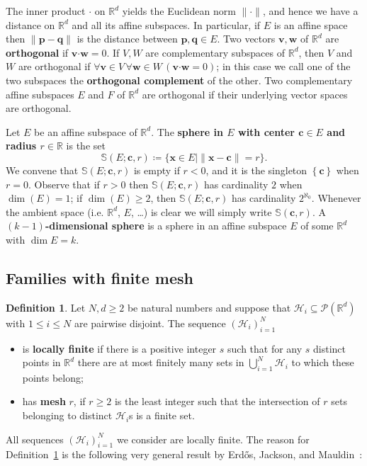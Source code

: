 \documentclass[12pt]{amsart}
\newcommand{\FORALL}[1]{\forall {#1} \, }
\newcommand{\R}{\mathbb{R}}	%
\newcommand{\Pow}{\mathscr{P}}		%
\newcommand{\markdef}[1]{\textbf{#1}} %
\newcommand{\Mid}{\boldsymbol\mid}			%
\newcommand{\setof}[2]{\mathopen \{{#1}\Mid{#2} \mathclose\}} %
\newcommand{\setLR}[1]{\left \{ {#1} \right \}} %
\theoremstyle{plain}
\theoremstyle{definition}
\newtheorem{definition}[theorem]{Definition}
\theoremstyle{remark}
\begin{document}
The inner product \( \boldsymbol{\cdot} \) on \( \R^d \) yields the Euclidean norm \( \| \cdot \| \), and hence we have a distance on \( \R^d \) and all its affine subspaces.
In particular, if \( E \) is an affine space then \( \| \mathbf{p} - \mathbf{q} \| \) is the distance between \( \mathbf{p} , \mathbf{q} \in E \).
Two vectors \( \mathbf{v} ,\mathbf{w} \) of \( \R^d \) are \markdef{orthogonal} if \( \mathbf{v} \boldsymbol{\cdot} \mathbf{w} = 0 \).
If \( V , W \) are complementary subspaces of \( \R^d \), then \( V \) and \( W \) are orthogonal if \( \FORALL{\mathbf{v} \in V} \FORALL{\mathbf{w} \in W} ( \mathbf{v} \boldsymbol{\cdot} \mathbf{w} = 0 ) \); in this case we call one of the two subspaces the \markdef{orthogonal complement} of the other.
Two complementary affine subspaces \( E \) and \( F \) of \( \R^d \) are orthogonal if their underlying vector spaces are orthogonal.

Let \( E \) be an affine subspace of \( \R^d \).
The \markdef{sphere in \( E\) with center \( \mathbf{c} \in E \) and radius \( r \in \R \)} is the set
\[
 \mathbb{S} ( E ; \mathbf{c} , r ) \coloneqq \setof { \mathbf{x} \in E }{ \| \mathbf{x} - \mathbf{c} \| = r } .
\]
We convene that \( \mathbb{S} ( E ; \mathbf{c} , r ) \) is empty if \( r < 0 \), and it is the singleton \( \setLR{ \mathbf{c} } \) when \( r = 0 \).
Observe that if \( r > 0 \) then \( \mathbb{S} ( E ; \mathbf{c} , r ) \) has cardinality \( 2 \) when \( \dim ( E ) = 1 \); if \( \dim ( E ) \geq 2 \), then \( \mathbb{S} ( E ; \mathbf{c} , r ) \) has cardinality \( 2^{\aleph_0} \).
Whenever the ambient space (i.e. \( \R^d \), \( E \), \ldots) is clear we will simply write \( \mathbb{S} ( \mathbf{c} , r ) \).
A \markdef{\( ( k - 1 ) \)-dimensional sphere} is a sphere in an affine subspace \( E \) of some \( \R^d \) with \( \dim E = k \).

\subsection{Families with finite mesh}
\begin{definition}\label{def:finitemesh}
Let \( N , d \geq 2 \) be natural numbers and suppose that \( \mathcal{H}_i \subseteq \Pow ( \R^d ) \) with \( 1 \leq i \leq N \) are pairwise disjoint.
The sequence \( ( \mathcal{H}_i )_{ i = 1}^N \) 
\begin{itemize}
\item
is \markdef{locally finite} if there is a positive integer \( s \) such that for any \( s \) distinct points in \( \R^d \) there are at most finitely many sets in \( \bigcup_{ i = 1 }^N \mathcal{H}_i \) to which these points belong;
\item
has \markdef{mesh} \( r \), if \( r \geq 2 \) is the least integer such that the intersection of \( r \) sets belonging to distinct \( \mathcal{H}_i \)s is a finite set.
\end{itemize}
\end{definition}
All sequences \( ( \mathcal{H}_i )_{ i = 1 }^N \) we consider are locally finite.
The reason for Definition~\ref{def:finitemesh} is the following very general result by Erd\H{o}s, Jackson, and Mauldin~\cite[Theorem 2]{Erdos:1994yq}:
\end{document}
